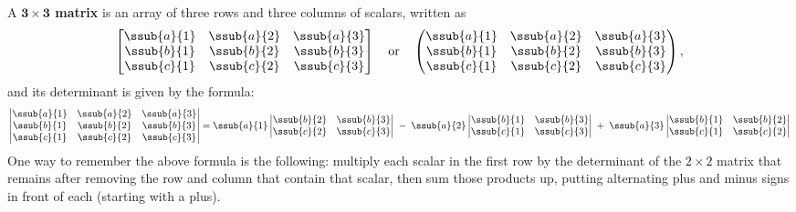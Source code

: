 A \textbf{$\bm{3 \times 3}$ matrix} is an array of three rows and three columns of scalars, written as
\begin{displaymath}
 \begin{bmatrix}
  \ssub{a}{1} & \ssub{a}{2} &\ssub{a}{3}\\
  \ssub{b}{1} & \ssub{b}{2} &\ssub{b}{3}\\
  \ssub{c}{1} & \ssub{c}{2} &\ssub{c}{3}
 \end{bmatrix}
 \quad\text{or}\quad
 \begin{pmatrix}
  \ssub{a}{1} & \ssub{a}{2} &\ssub{a}{3}\\
  \ssub{b}{1} & \ssub{b}{2} &\ssub{b}{3}\\
  \ssub{c}{1} & \ssub{c}{2} &\ssub{c}{3}
 \end{pmatrix},
\end{displaymath}
and its determinant is given by the formula:
\begin{equation}
 \begin{vmatrix}
  \ssub{a}{1} & \ssub{a}{2} &\ssub{a}{3}\\
  \ssub{b}{1} & \ssub{b}{2} &\ssub{b}{3}\\
  \ssub{c}{1} & \ssub{c}{2} &\ssub{c}{3}
 \end{vmatrix}
 = \ssub{a}{1} \begin{vmatrix} \ssub{b}{2} & \ssub{b}{3} \\ \ssub{c}{2} & \ssub{c}{3} \end{vmatrix} \;-\;
 \ssub{a}{2} \begin{vmatrix} \ssub{b}{1} & \ssub{b}{3} \\ \ssub{c}{1} & \ssub{c}{3} \end{vmatrix} \;+\;
 \ssub{a}{3} \begin{vmatrix} \ssub{b}{1} & \ssub{b}{2} \\ \ssub{c}{1} & \ssub{c}{2} \end{vmatrix}\label{eqn:det3}
\end{equation}
One way to remember the above formula is the following: multiply each scalar in the first row by the determinant
of the $2 \times 2$ matrix that remains after removing the row and column that contain that scalar, then sum those
products up, putting alternating plus and minus signs in front of each (starting with a plus).

